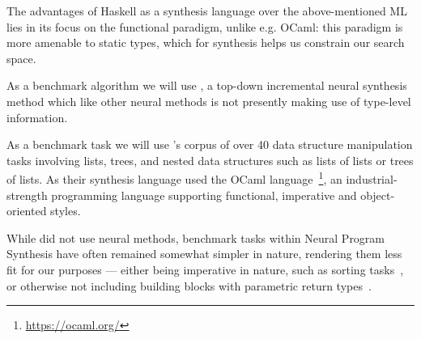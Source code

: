 \documentclass{article}
\begin{document}
The advantages of Haskell as a synthesis language over the above-mentioned ML lies in its focus on the functional paradigm, unlike e.g. OCaml: this paradigm is more amenable to static types, which for synthesis helps us constrain our search space.


As a benchmark algorithm we will use \cite{nsps}, a top-down incremental neural synthesis method which like other neural methods is not presently making use of type-level information.


As a benchmark task we will use \cite{feser2015synthesizing}'s corpus of over 40 data structure manipulation tasks involving lists, trees, and nested data structures such as lists of lists or trees of lists.
As their synthesis language \cite{feser2015synthesizing} used the OCaml language~\footnote{\url{https://ocaml.org/}}, an industrial-strength programming language supporting functional, imperative and object-oriented styles.

While \cite{feser2015synthesizing} did not use neural methods, benchmark tasks within Neural Program Synthesis have often remained somewhat simpler in nature, rendering them less fit for our purposes --- either being imperative in nature, such as sorting tasks~\citep{reed2015neural}, or otherwise not including building blocks with parametric return types~\citep{nsps}.

\end{document}
